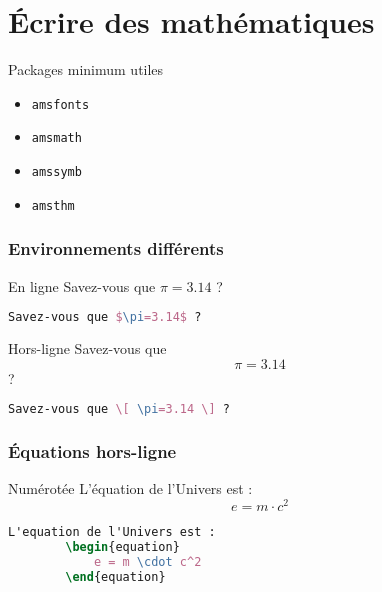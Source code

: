 \section{Écrire des mathématiques}

\begin{frame}{Packages minimum utiles}
    \begin{itemize}[label=$\triangleright$]
        \item \texttt{amsfonts}
        \item \texttt{amsmath}
        \item \texttt{amssymb}
        \item \texttt{amsthm}
    \end{itemize}
\end{frame}

\begin{frame}[containsverbatim]
    \frametitle{Environnements différents}
    \begin{exampleblock}{En ligne}
        Savez-vous que $\pi=3.14$ ?
    \end{exampleblock}
    \begin{lstlisting}[language=TeX]
        Savez-vous que $\pi=3.14$ ?
    \end{lstlisting}
    \bigskip
    \begin{exampleblock}{Hors-ligne}
        Savez-vous que \[ \pi=3.14 \] ?
    \end{exampleblock}
    \begin{lstlisting}[language=TeX]
        Savez-vous que \[ \pi=3.14 \] ?
    \end{lstlisting}
\end{frame}

\begin{frame}[containsverbatim]
    \frametitle{Équations hors-ligne}
    \begin{exampleblock}{Numérotée}
        L'équation de l'Univers est :
        \begin{equation}
            e = m\cdot c^2
        \end{equation}
    \end{exampleblock}
    \begin{lstlisting}[language=TeX]
        L'equation de l'Univers est :
        \begin{equation}
            e = m \cdot c^2
        \end{equation}
    \end{lstlisting}
    \bigskip
\end{frame}

